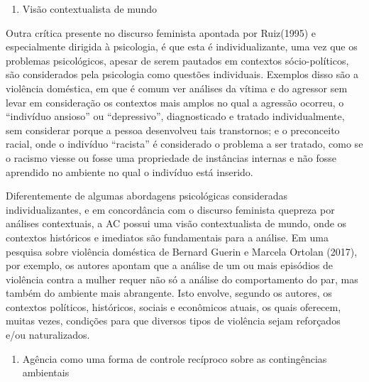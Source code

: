 \begin{enumerate}[resume]
    \item Visão contextualista de mundo
\end{enumerate} 

Outra crítica presente no discurso feminista apontada por Ruiz\linebreak (1995) e especialmente dirigida à psicologia, é que esta é individualizante, uma vez que os problemas psicológicos, apesar de serem pautados em contextos sócio-políticos, são considerados pela psicologia como questões individuais. Exemplos disso são a violência doméstica, em que é comum ver análises da vítima e do agressor sem levar em consideração os contextos mais amplos no qual a agressão ocorreu, o ``indivíduo ansioso'' ou ``depressivo'', diagnosticado e tratado individualmente, sem considerar porque a pessoa desenvolveu tais transtornos; e o preconceito racial, onde o indivíduo ``racista'' é considerado o problema a ser tratado, como se o racismo viesse ou fosse uma propriedade de instâncias internas e não fosse aprendido no ambiente no qual o indivíduo está inserido. 

Diferentemente de algumas abordagens psicológicas consideradas individualizantes, e em concordância com o discurso feminista que\linebreak preza por análises contextuais, a AC possui uma visão contextualista de mundo, onde os contextos históricos e imediatos são fundamentais para a análise. Em uma pesquisa sobre violência doméstica de Bernard Guerin e Marcela Ortolan (2017), por exemplo, os autores apontam que a análise de um ou mais episódios de violência contra a mulher requer não só a análise do comportamento do par, mas também do ambiente mais abrangente. Isto envolve, segundo os autores, os contextos políticos, históricos, sociais e econômicos atuais, os quais oferecem, muitas vezes, condições para que diversos tipos de violência sejam reforçados e/ou naturalizados. 

\begin{enumerate}[resume]
    \item Agência como uma forma de controle recíproco sobre as contingências ambientais
\end{enumerate}

